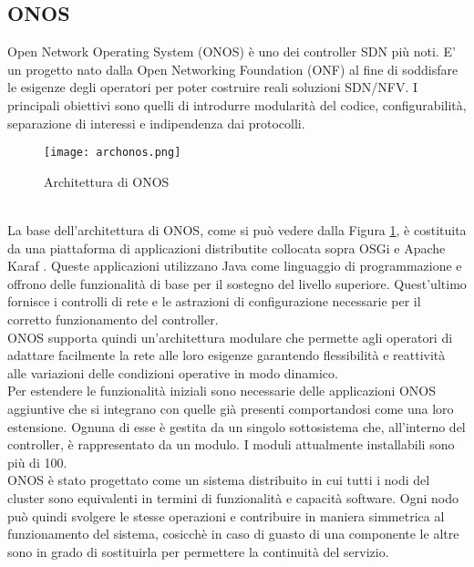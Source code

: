 \subsection{ONOS}
Open Network Operating System (ONOS) \cite{ONOS} è uno dei controller SDN più noti. 
E' un progetto nato dalla Open Networking Foundation (ONF) \cite{ONF} al fine di soddisfare le esigenze degli operatori per poter costruire reali soluzioni SDN/NFV.
I principali obiettivi sono quelli di introdurre modularità del codice, configurabilità, separazione di interessi e indipendenza dai protocolli.
\begin{figure}[h]
    \centering
   \texttt{[image: archonos.png]}
    \caption{Architettura di ONOS \cite{archonos}}
    \label{fig:img3}
\end{figure}
\\La base dell'architettura di ONOS, come si può vedere dalla Figura \ref{fig:img3}, è costituita da una piattaforma di applicazioni distributite
collocata sopra OSGi \cite{osgi} e Apache Karaf \cite{Apache}. %
Queste applicazioni utilizzano Java come linguaggio di programmazione e offrono delle funzionalità di base per il sostegno del livello superiore.
Quest'ultimo fornisce i controlli di rete e le astrazioni di configurazione necessarie per il corretto funzionamento del controller.
\\ONOS supporta quindi un'architettura modulare che permette agli operatori di adattare facilmente la rete alle loro esigenze 
garantendo flessibilità e reattività alle variazioni delle condizioni operative in modo dinamico.
\\Per estendere le funzionalità iniziali sono necessarie delle applicazioni ONOS aggiuntive che si integrano con quelle già presenti comportandosi come una loro estensione. 
Ognuna di esse è gestita da un singolo sottosistema che, all'interno del controller, è rappresentato da un modulo.
I moduli attualmente installabili sono più di 100.
\\ONOS è stato progettato come un sistema distribuito in cui tutti i nodi del cluster sono equivalenti in termini di funzionalità e capacità software.
Ogni nodo può quindi svolgere le stesse operazioni e contribuire in maniera simmetrica al funzionamento del sistema, cosicchè
in caso di guasto di una componente le altre sono in grado di sostituirla per permettere la continuità del servizio. 
